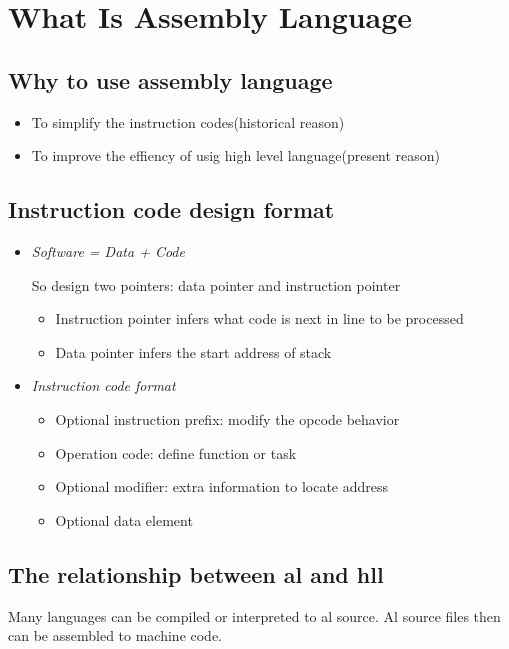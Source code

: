 \chapter{What Is Assembly Language}
\section{Why to use assembly language}
\begin{itemize}
    \item To simplify the instruction codes(historical reason)
    \item To improve the effiency of usig high level language(present reason)
\end{itemize}
\section{Instruction code design format}
\begin{itemize}
    \item \emph{Software = Data + Code}
        
        So design two pointers: data pointer and instruction pointer
        \begin{itemize} 
            \item Instruction pointer infers what code is next in line to be processed
            \item Data pointer infers the start address of stack
        \end{itemize}
    \item \emph{Instruction code format}
        \begin{itemize}
            \item Optional instruction prefix: modify the opcode behavior
            \item Operation code: define function or task
            \item Optional modifier: extra information to locate address
            \item Optional data element
        \end{itemize}
\end{itemize}
\section{The relationship between al and hll}
Many languages can be compiled or interpreted to al source. Al source files then can be assembled to machine code.
